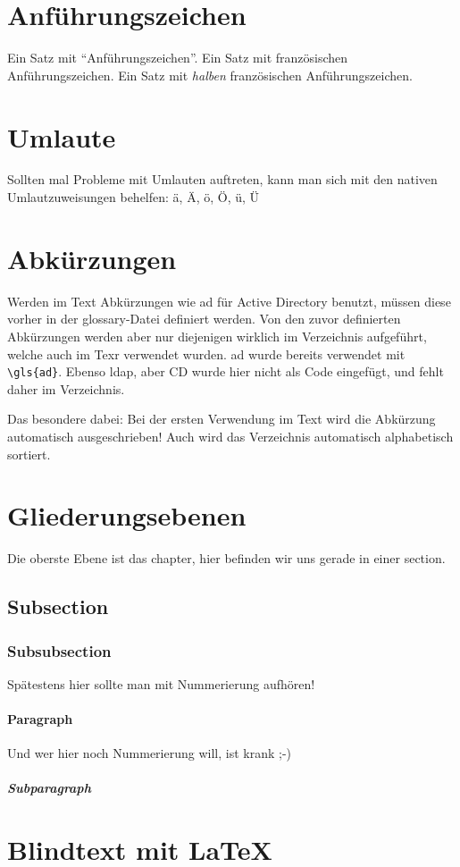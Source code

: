 \section{Anführungszeichen}
Ein Satz mit "`Anführungszeichen"'.
Ein Satz mit französischen \frqq Anführungszeichen\flqq.
Ein Satz mit \textit{halben} französischen \frq Anführungszeichen\flq.


\section{Umlaute}
Sollten mal Probleme mit Umlauten auftreten, kann man sich mit den nativen Umlautzuweisungen behelfen:
\"a, \"A, \"o, \"O, \"u, \"U


\section{Abkürzungen}
Werden im Text Abkürzungen wie \gls{ad} für Active Directory benutzt, müssen diese vorher in der glossary-Datei definiert werden.
Von den zuvor definierten Abkürzungen werden aber nur diejenigen wirklich im Verzeichnis aufgeführt, welche auch im Texr verwendet wurden.
\gls{ad} wurde bereits verwendet mit \verb+\gls{ad}+. Ebenso \gls{ldap}, aber CD wurde hier nicht als Code eingefügt, und fehlt daher im Verzeichnis.

Das besondere dabei: Bei der ersten Verwendung im Text wird die Abkürzung automatisch ausgeschrieben! Auch wird das Verzeichnis automatisch alphabetisch sortiert.


\section{Gliederungsebenen}
Die oberste Ebene ist das chapter, hier befinden wir uns gerade in einer section.
\subsection{Subsection}
\subsubsection{Subsubsection}
Spätestens hier sollte man mit Nummerierung aufhören!
\paragraph{Paragraph}
Und wer hier noch Nummerierung will, ist krank ;-)
\subparagraph{Subparagraph}

\section{Blindtext mit \LaTeX}
\lipsum
